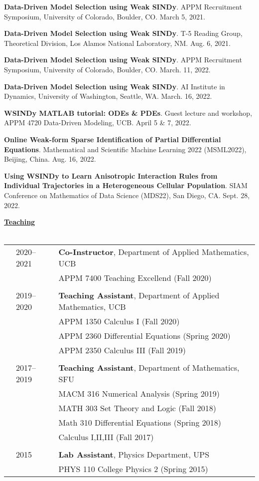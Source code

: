 \documentclass[letterpaper,11pt,oneside]{article}
\newcommand{\headr}[1]{\vspace{10pt}\uline{\Large{\textbf{#1}} \hfill } \\ \vspace{-10pt}\\}
\begin{document}
\begin{enumerate}[label={[\arabic*]}]
\item \textbf{Data-Driven Model Selection using Weak SINDy}. APPM Recruitment Symposium, University of Colorado, Boulder, CO. March 5, 2021.
\item \textbf{Data-Driven Model Selection using Weak SINDy}. T-5 Reading Group, Theoretical Division, Los Alamos National Laboratory, NM. Aug. 6, 2021.
\item \textbf{Data-Driven Model Selection using Weak SINDy}. APPM Recruitment Symposium, University of Colorado, Boulder, CO. March. 11, 2022.
\item \textbf{Data-Driven Model Selection using Weak SINDy}. AI Institute in Dynamics, University of Washington, Seattle, WA. March. 16, 2022.
\item \textbf{WSINDy MATLAB tutorial: ODEs \& PDEs}. Guest lecture and workshop, APPM 4720 Data-Driven Modeling, UCB. April 5 \& 7, 2022.
\item \textbf{Online Weak-form Sparse Identification of Partial Differential Equations}. Mathematical and Scientific Machine Learning 2022 (MSML2022), Beijing, China. Aug. 16, 2022.
\item \textbf{Using WSINDy to Learn Anisotropic Interaction 
Rules from Individual Trajectories in a Heterogeneous Cellular Population}. SIAM Conference on Mathematics of Data Science (MDS22), San Diego, CA. Sept. 28, 2022.
\end{enumerate}

\headr{Teaching}

\begin{tabular}{@{} p{0.01cm} p{2cm} p{14cm}}
& 2020--2021 & \textbf{Co-Instructor}, Department of Applied Mathematics, UCB \\
&     & APPM 7400 Teaching Excellend (Fall 2020)\\
&&\\
& 2019-- 2020 & \textbf{Teaching Assistant}, Department of Applied Mathematics, UCB \\
&     & APPM 1350 Calculus I (Fall 2020)\\
&     & APPM 2360 Differential Equations (Spring 2020)\\
&     & APPM 2350 Calculus III (Fall 2019)\\
&&\\
& 2017--2019  & \textbf{Teaching Assistant}, Department of Mathematics, SFU  \\
&     & MACM 316 Numerical Analysis (Spring 2019) \\
&     & MATH 303 Set Theory and Logic (Fall 2018) \\ 
&     & Math 310 Differential Equations (Spring 2018) \\ 
&     & Calculus I,II,III (Fall 2017)\\
&&\\
& 2015  &\textbf{Lab Assistant}, Physics Department, UPS \\
&     & PHYS 110 College Physics 2 (Spring 2015) \\
\end{tabular}
\end{document}
